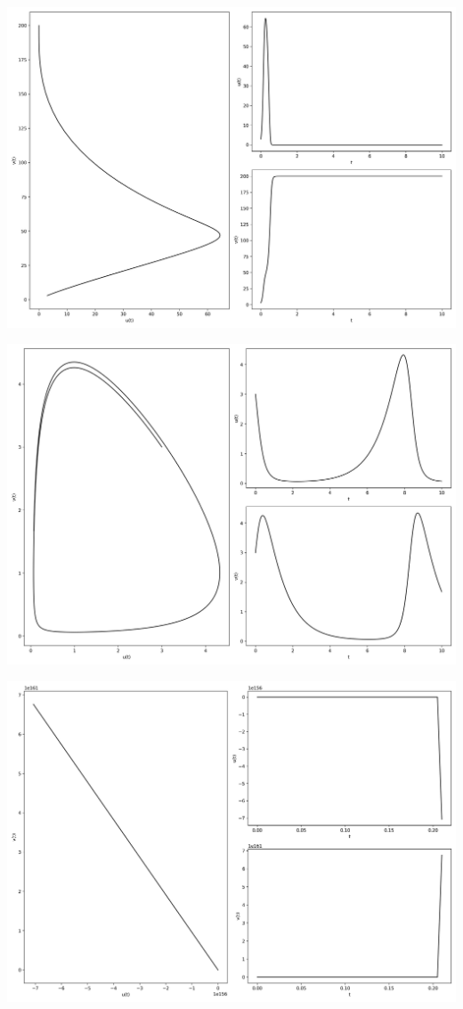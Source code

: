 \documentclass[12pt,a4paper]{jsarticle}
\makeatletter
\def\figcaption{\def\@captype{figure}\caption}
\makeatother
\begin{document}
\figcaption{$u_0=3.00, v_0=3.00, a_1=23.20, b_1=-0.60, c_1=-0.40, a_2=18.80, b_2=-0.50, c_2=-0.30, T = 10, N = 1000$}
\includegraphics[scale=0.33]{u3,0v3,0a125,0b1-0,1c1-0,4a220,0b2-0,2c2-0,1t1,00e+01n1,00e+03.png}
\figcaption{$u_0=3.00, v_0=3.00, a_1=25.00, b_1=-0.10, c_1=-0.40, a_2=20.00, b_2=-0.20, c_2=-0.10, T = 10, N = 1000$}
\includegraphics[scale=0.33]{u3,0v3,0a11,0b10,0c1-1,0a2-1,0b21,0c20,0t1,00e+01n2,00e+03.png}
\figcaption{$u_0=3.00, v_0=3.00, a_1=1.00, b_1=0.00, c_1=-1.00, a_2=-1.00, b_2=0.00, c_2=0.00, T = 10, N = 2000$}
\includegraphics[scale=0.33]{u3,0v3,0a11,9b10,0c1-1,9a21,9b20,0c21,9t1,00e+01n2,00e+03.png}
\end{document}
